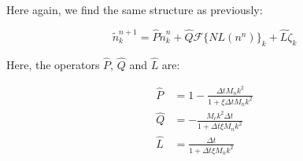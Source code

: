 \documentclass[11pt]{article}
\newcommand{\til}{\tilde}
\begin{document}
Here again, we find the same structure as previously:

\begin{equation}
\til{n}_k^{n+1} = \hat{P}\til{n}_k^n + \hat{Q}\mathcal{F}\lbrace NL(n^n)\rbrace_k + \hat{L} \til{\zeta}_k
\end{equation}

Here, the operators $\hat{P}$, $\hat{Q}$ and $\hat{L}$ are:

\begin{align}
\hat{P} &= 1 - \frac{\Delta t M_n k^2}{1 + \xi\Delta t M_n k^2}  \\
\hat{Q} &= -\frac{M_c k^2 \Delta t}{1 + \Delta t \xi M_n k^2} \\
\hat{L} &= \frac{\Delta t}{1 + \Delta t \xi M_n k^2} 
\end{align}
\end{document}
